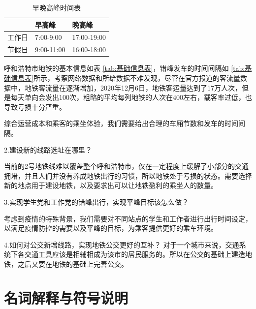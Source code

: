 \documentclass[12pt,a4paper]{mcmthesis}
\begin{document}
    \begin{table}
        \centering
        \begin{tabular}{|l|l|l|}
            \hline
            & 早高峰        & 晚高峰         \\ \hline
            工作日 & 7:00-9:00  & 17:00-19:00 \\ \hline
            节假日 & 9:00-11:00 & 16:00-18:00 \\ \hline
        \end{tabular}
        \caption{早晚高峰时间表}
        \label{tab:早晚高峰}
    \end{table}


    呼和浩特市地铁的基本信息如表 \ref{tab:基础信息表}，错峰发车的时间间隔如 \ref{tab:基础信息表}所示，考察网络数据和所给数据不难发现，尽管在官方报道的客流量数据中，地铁客流量在逐渐增加，2020年12月6日，地铁客运量达到了17万人次，但是每天单向会发出100次，粗略的平均每列地铁的人次在400左右，载客率过低，也导致亏损十分严重。

    综合运营成本和乘客的乘坐体验，我们需要给出合理的车厢节数和发车的时间间隔。

        {2.建设新的线路选址在哪里？}

    当前的2号地铁线难以覆盖整个呼和浩特市，仅在一定程度上缓解了小部分的交通拥堵，并且人们并没有养成地铁出行的习惯，所以地铁处于亏损的状态。需要选择新的地点用于建设地铁，以及要求出可以让地铁盈利的乘坐人的数量。

        {3.实现学生党和工作党的错峰出行，实现平峰目标该怎么做？}

    考虑到疫情的特殊背景，我们需要对不同站点的学生和工作者进行出行时间设定，以满足疫情防控的需要以及平峰的目标，为乘客提供更好的乘车环境。

        {4.如何对公交新增线路，实现地铁公交更好的互补？}
    对于一个城市来说，交通系统下各交通工具应该是相辅相成为该市的居民服务的。所以在公交的基础上建造地铁，之后又要在地铁的基础上完善公交。


    \section{名词解释与符号说明}
\end{document}
